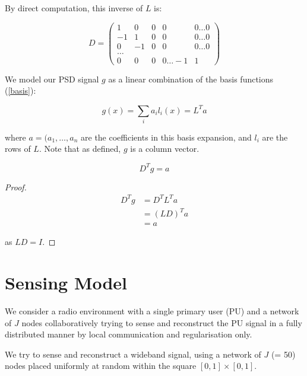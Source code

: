 \documentclass[conference]{IEEEtran}
\begin{document}
By direct computation, this inverse of \(L\) is:

\begin{equation}
D = \begin{pmatrix}
 1 & 0 & 0 & 0  & 0 \ldots 0 \\
  -1 & 1 & 0 & 0  & 0 \ldots 0\\
     0 & -1 & 0 & 0  & 0 \ldots0  \\
    \ldots  \\
     0 & 0 & 0 & 0  \ldots -1 & 1
\end{pmatrix}
\end{equation}

We model our PSD signal \(g\) as a linear combination of the basis functions (\ref{basis}):

\begin{equation}
g\left(x\right) = \sum_i a_i l_i\left(x\right) = L^Ta
\label{basis-expansion}
\end{equation}

where \(a = (a_1, \ldots, a_n\) are the coefficients in this basis expansion, and \(l_i\) are the rows of \(L\). Note that as defined, \(g\) is a column vector.

\begin{proposition}
\begin{equation}
D^Tg = a
\end{equation}
\label{def:a}
\end{proposition}
\begin{proof}

\begin{align}
D^Tg &= D^T L^T a \\
&= \left(LD\right)^Ta \\
&= a
\end{align}

as \(LD = I\).

\end{proof}

\section{Sensing Model}\label{sec:sensingmodel}

We consider a radio environment with a single primary user (PU) and a network of \(J\) nodes collaboratively trying to sense and reconstruct the PU signal in a fully distributed manner by local communication and regularisation only.

We try to sense and reconstruct a wideband signal, using a network of \(J\) (= 50) nodes placed uniformly at random within the square \(  \left[0,1\right]\times \left[0,1\right] \). 
\end{document}
